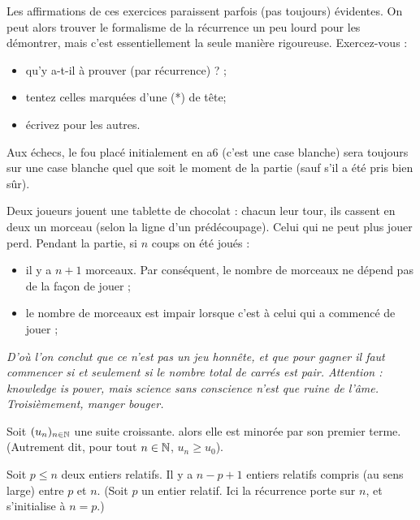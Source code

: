 \documentclass[a4paper,11pt,DIV14,BCOR0mm]{scrartcl}
\begin{document}
Les affirmations de ces exercices paraissent parfois (pas toujours) \og évidentes\fg. On peut alors trouver le formalisme 
de la récurrence un peu lourd pour les démontrer, mais c'est essentiellement la seule manière rigoureuse. Exercez-vous :
\begin{itemize}
 \item qu'y a-t-il à prouver (par récurrence) ? ;
 \item tentez celles marquées d'une (*) \og de tête\fg ;
 \item écrivez pour les autres.
\end{itemize}

\begin{exercice}[*, invariant]
 Aux échecs, le fou placé initialement en a6 (c'est une case blanche) sera toujours sur une case blanche quel que soit
le moment de la partie (sauf s'il a été pris bien sûr).
\end{exercice}

\begin{exercice}
 Deux joueurs jouent une tablette de chocolat : chacun leur tour, ils cassent en deux un morceau (selon la ligne
d'un prédécoupage).
Celui qui ne peut plus jouer perd.
Pendant la partie, si $n$ coups on été joués :
\begin{itemize}
 \item il y a $n+1$ morceaux. Par conséquent, le nombre de morceaux ne dépend pas de la façon de jouer ;
 \item le nombre de morceaux est impair lorsque c'est à celui qui a commencé de jouer ;
\end{itemize}

\emph{D'o\`u l'on conclut que ce n'est pas un jeu honnête, et que pour gagner il faut commencer si et seulement si 
le nombre total de carrés est pair. Attention : knowledge is power, mais science sans conscience n'est que ruine de l'\^ame.
Troisièmement, manger bouger.}
\end{exercice}



\begin{exercice}[*]
 Soit $(u_n)_{n\in\mathbb{N}}$ une suite croissante. alors elle est minorée par son premier terme. (Autrement dit, 
pour tout $n\in\mathbb{N}$, $u_n\geq u_0$).
\end{exercice}


\begin{exercice}
 Soit $p\leq n$ deux entiers relatifs. Il y a $n-p+1$ entiers relatifs compris (au sens large) entre $p$ et $n$.
(Soit $p$ un entier relatif. Ici la récurrence porte sur $n$, et s'initialise à $n=p$.)
\end{exercice}
\end{document}
